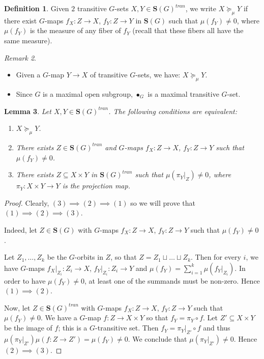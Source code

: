 \documentclass[11pt,a4paper]{amsart}
\theoremstyle{plain}%
\newtheorem{lemma}{Lemma}[subsection]
\theoremstyle{definition}
\newtheorem{definition}[lemma]{Definition}
\theoremstyle{remark}
\newtheorem{remark}[lemma]{Remark}
\begin{document}
\begin{definition}

Given $2$ transitive $G$-sets $X, Y\in \mathbf{S}(G)^{tran}$, we write $X\succeq_\mu Y$ if there exist $G$-maps $f_X:Z\to X$, $f_Y:Z\to Y$ in $\mathbf{S}(G)$ such that $\mu(f_Y)\neq0$, where $\mu(f_Y)$ is the measure of any fiber of $f_Y$ (recall that these fibers all have the same measure).




\end{definition}
\begin{remark}

\mbox{}

    \begin{itemize}[itemindent=0pt,leftmargin=*]
    \item Given a $G$-map $Y\to X$ of transitive $G$-sets, we have: $X\succeq_\mu Y$.
        \item {Since} $G$ is a maximal open subgroup, $\bullet_G$ is a maximal transitive $G$-set.
    \end{itemize}
\end{remark}
\begin{lemma}\label{lem:succeq_mu}
    Let $X, Y\in \mathbf{S}(G)^{tran}$. The following conditions are equivalent:
    \begin{enumerate}
        \item $X\succeq_\mu Y$.
        \item There exists $Z \in \mathbf{S}(G)^{tran}$ and $G$-maps $f_X:Z\to X$, $f_Y:Z\to Y$ such that $\mu(f_Y)\neq 0$.
        \item There exists $Z\subseteq X\times Y$ in $\mathbf{S}(G)^{tran}$ such that $\mu(\pi_Y\rvert_Z)\neq 0$, where $\pi_Y: X\times Y\to Y$ is the projection map.
    \end{enumerate}
\end{lemma}
\begin{proof}
Clearly, $(3) \implies (2)\implies (1)$ so we will prove that $(1)\implies (2)\implies  (3)$.

    Indeed, let $Z\in {\mathbf{S}(G)}$ with $G$-maps $f_X:Z\to X$, $f_Y:Z\to Y$ such that $\mu(f_Y)\neq0$. 
            
    Let $Z_1, \ldots, Z_k$ be the $G$-orbits in $Z$, so that $Z=Z_1 \sqcup \ldots{\sqcup} Z_k$. Then for every $i$, we have $G$-maps $f_X\rvert_{Z_i}:Z_i\to X$, $f_Y\rvert_{Z_i}:Z_i\to Y$ and $\mu(f_Y)= \sum_{i=1}^k\mu(f_Y\rvert_{Z_i})$. In order to have $\mu(f_Y)\neq 0$, at least one of the summands must be non-zero. Hence $(1)\implies (2)$. 
    
    Now, let $Z\in \mathbf{S}(G)^{tran}$ with $G$-maps $f_X:Z\to X$, $f_Y:Z\to Y$ such that $\mu(f_Y)\neq0$.  We have a $G$-map $f:Z\to X\times Y$ so that $f_Y=\pi_Y\circ f$. Let $Z'\subseteq X\times Y$ be the image of $f$; this is a $G$-transitive set. Then $f_Y=\pi_Y\rvert_{Z'}\circ f $ and thus $\mu(\pi_Y\rvert_{Z'})\mu( f:Z\to Z') = \mu(f_Y)\neq 0$. We conclude that $\mu(\pi_Y\rvert_{Z'})\neq 0$. Hence $(2)\implies (3)$.
\end{proof}
\end{document}
